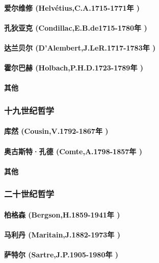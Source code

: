 \documentclass[UTF8]{../RepresentationUniverse}
\begin{document}
    \paragraph{爱尔维修 (Helvétius,C.A.1715-1771年 )}
    \paragraph{孔狄亚克 (Condillac,E.B.de1715-1780年 )}
    \paragraph{达兰贝尔 (D'Alembert,J.LeR.1717-1783年 )}
    \paragraph{霍尔巴赫 (Holbach,P.H.D.1723-1789年 )}
    \paragraph{其他}

\subsubsection{十九世纪哲学}
    \paragraph{库然 (Cousin,V.1792-1867年 )}
    \paragraph{奥古斯特·孔德 (Comte,A.1798-1857年 )}
    \paragraph{其他}
\subsubsection{二十世纪哲学}
    \paragraph{柏格森 (Bergson,H.1859-1941年 )}
    \paragraph{马利丹 (Maritain,J.1882-1973年 )}
    \paragraph{萨特尔 (Sartre,J.P.1905-1980年 )}
\end{document}
